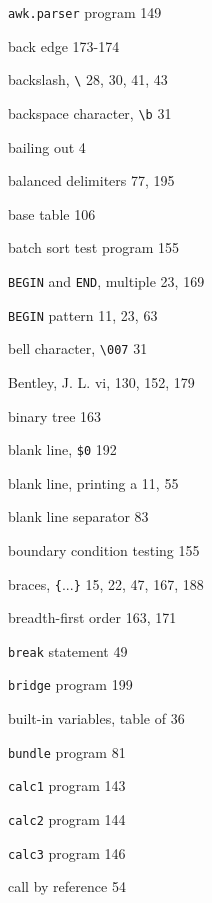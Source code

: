 \begin{multicols}{3}
\hangindent=4pc  \verb'awk.parser' program 149

\hangindent=4pc  back edge 173-174

\hangindent=4pc  backslash, \verb'\' 28, 30, 41, 43

\hangindent=4pc  backspace character, \verb'\b' 31

\hangindent=4pc  bailing out 4

\hangindent=4pc  balanced delimiters 77, 195

\hangindent=4pc  base table 106

\hangindent=4pc  batch sort test program 155

\hangindent=4pc  \verb'BEGIN' and \verb'END', multiple 23, 169

\hangindent=4pc  \verb'BEGIN' pattern 11, 23, 63

\hangindent=4pc  bell character, \verb'\007' 31

\hangindent=4pc  Bentley, J. L. vi, 130, 152, 179
\hangindent=4pc  

\hangindent=4pc  binary tree 163

\hangindent=4pc  blank line, \verb'$0' 192

\hangindent=4pc  blank line, printing a 11, 55

\hangindent=4pc  blank line separator 83

\hangindent=4pc  boundary condition testing 155

\hangindent=4pc  braces, \verb'{'...\verb'}' 15, 22, 47, 167, 188

\hangindent=4pc  breadth-first order 163, 171

\hangindent=4pc  \verb'break' statement 49

\hangindent=4pc  \verb'bridge' program 199

\hangindent=4pc  built-in variables, table of 36

\hangindent=4pc  \verb'bundle' program 81

\hangindent=4pc  \verb'calc1' program 143

\hangindent=4pc  \verb'calc2' program 144

\hangindent=4pc  \verb'calc3' program 146

\hangindent=4pc  call by reference 54


\end{multicols}
